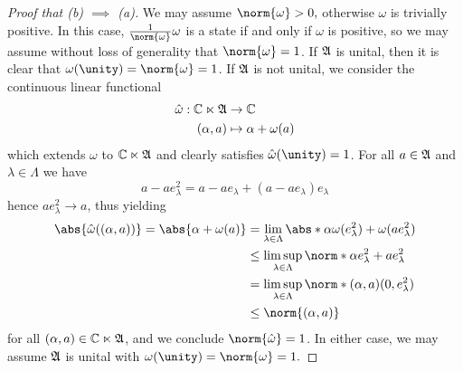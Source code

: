 \begin{proof}[Proof that (b) \(\implies\) (a)]
    We may assume \(\norm{\omega} > 0,\) otherwise \(\omega\) is trivially positive. In this case, \(\frac{1}{\norm{\omega}}\omega\) is a state if and only if \(\omega\) is positive, so we may assume without loss of generality that \(\norm{\omega} = 1\). If \(\mathfrak{A}\) is unital, then it is clear that \(\omega(\unity) = \norm{\omega} = 1\). If \(\mathfrak{A}\) is not unital, we consider the continuous linear functional
    \begin{align*}
        \hat{\omega} : \mathbb{C} \ltimes \mathfrak{A} &\to \mathbb{C}\\
                                           (\alpha,a) &\mapsto \alpha + \omega(a)
    \end{align*}
    which extends \(\omega\) to \(\mathbb{C} \ltimes \mathfrak{A}\) and clearly satisfies \(\hat{\omega}(\unity) = 1\). For all \(a \in \mathfrak{A}\) and \(\lambda \in \Lambda\) we have
    \begin{equation*}
        a - ae_{\lambda}^2 = a - ae_{\lambda} + (a - ae_{\lambda})e_{\lambda}
    \end{equation*}
    hence \(ae_{\lambda}^2 \to a\), thus yielding
    \begin{align*}
        \abs{\hat{\omega}((\alpha, a))} = \abs{\alpha + \omega(a)} 
        &= \lim_{\lambda \in \Lambda}{\abs*{\alpha \omega(e_{\lambda}^2) + \omega(a e_{\lambda}^2)}}\\
        &\leq \limsup_{\lambda \in \Lambda}{\norm*{\alpha e_{\lambda}^2 + a e_{\lambda}^2}}\\
        &= \limsup_{\lambda \in \Lambda}{\norm*{(\alpha, a) (0, e_{\lambda}^2)}}\\
        &\leq \norm{(\alpha, a)}
    \end{align*}
    for all \((\alpha, a) \in \mathbb{C} \ltimes \mathfrak{A}\), and we conclude \(\norm{\hat{\omega}} = 1\). In either case, we may assume \(\mathfrak{A}\) is unital with \(\omega(\unity) = \norm{\omega} = 1.\)


\end{proof}

